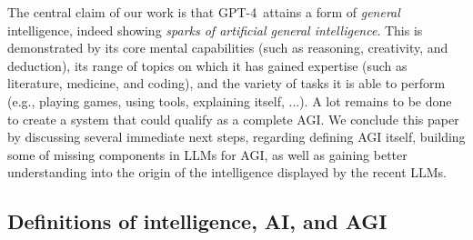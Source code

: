 The central claim of our work is that GPT-4\ attains a form of \emph{general} intelligence, indeed showing {\em sparks of artificial general intelligence}. This is demonstrated by its core mental capabilities (such as reasoning, creativity, and deduction), its range of topics on which it has gained expertise (such as literature, medicine, and coding), and the variety of tasks it is able to perform (e.g., playing games, using tools, explaining itself, ...). A lot remains to be done to create a system that could qualify as a complete AGI. We conclude this paper by discussing several immediate next steps, regarding defining AGI itself, building some of missing components in LLMs for AGI, as well as gaining better understanding into the origin of the intelligence displayed by the recent LLMs.

\subsection{Definitions of intelligence, AI, and AGI} \label{sec:otherdefinitions}
